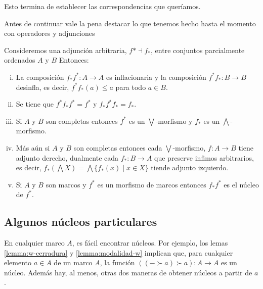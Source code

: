 Esto termina de establecer las correspondencias que queríamos.


Antes de continuar vale la pena destacar lo que tenemos hecho hasta el momento con operadores y adjunciones 

\begin{theorem}\label{posetad}
Consideremos una adjunción arbitraria, $f*\dashv f_{*}$, entre conjuntos parcialmente ordenados $A$ y $B$ 
Entonces:
\begin{enumerate}[(i)]
  \item La composición $f_{*}f^{*}\colon A\rightarrow A$ es inflacionaria y la composición $f^{*}f_{*}\colon B\rightarrow B$ desinfla, es decir, $f^{*}f_{*}(a)\leq a$ para todo $a\in B$.
  \item Se tiene que $f^{*}f_{*}f^{*}=f^{*}$ y $f_{*}f^{*}f_{*}=f_{*}$.
  \item Si $A$ y $B$ son completas entonces $f^{*}$ es un $\bigvee$-morfismo y $f_{*}$ es un $\bigwedge$-morfismo.
  \item Más aún si $A$ y $B$ son completas entonces cada $\bigvee$-morfismo, $f\colon A\rightarrow B$ tiene adjunto derecho, dualmente cada $f_{*}\colon B\rightarrow A$ que preserve infimos arbitrarios, es decir, $f_{*}(\bigwedge X)=\bigwedge\{f_{*}(x)\mid x\in X\}$ tiende adjunto izquierdo. 
  \item Si $A$ y $B$ son marcos y $f^{*}$ es un morfismo de marcos entonces $f_{*}f^{*}$ es el núcleo de $f^{*}$.    
\end{enumerate}
\end{theorem}



\subsection{Algunos núcleos particulares}

En cualquier marco $A$, es fácil encontrar núcleos.
Por ejemplo, los lemas \ref{lemma:w-cerradura}
y \ref{lemma:modalidad-w} implican que, para cualquier elemento
$a\in A$ de un marco $A$, la función $((-\succ a)\succ a):A\to A$
es un núcleo.
Además hay, al menos, otras dos maneras de obtener núcleos
a partir de $a$.

